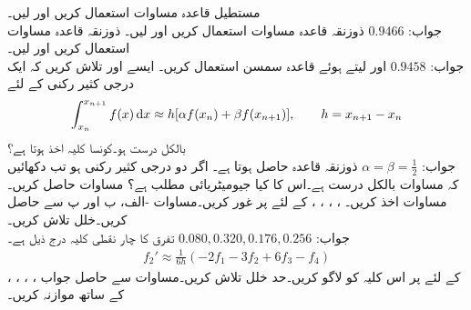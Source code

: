 \quad
مستطیل قاعدہ مساوات  استعمال کریں اور  لیں۔\\
جواب:\quad
$\num{0.9466}$
\quad
ذوزنقہ قاعدہ مساوات  استعمال کریں اور  لیں۔
\quad
ذوزنقہ قاعدہ مساوات  استعمال کریں اور  لیں۔\\
جواب:\quad
$\num{0.9458}$
\quad
{} اور  لیتے ہوئے قاعدہ سمسن  استعمال کریں۔
\quad
ایسے  اور  تلاش کریں کہ ایک درجی کثیر رکنی کے لئے
\begin{align*}
\int_{x_n}^{x_{n+1}}f(x)\dif x\approx h[\alpha f(x_n)+\beta f(x_{n+1})],\quad \quad h=x_{n+1}-x_n
\end{align*}
بالکل درست ہو۔کونسا کلیہ اخذ ہوتا ہے؟\\
جواب:\quad
$\alpha=\beta=\tfrac{1}{2}$
ذوزنقہ قاعدہ حاصل ہوتا ہے۔
\quad
اگر  دو درجی کثیر رکنی ہو تب دکھائیں کہ مساوات  بالکل درست ہے۔اس کا کیا جیومیٹریائی مطلب ہے؟  
\quad
مساوات  حاصل کریں۔
\quad
مساوات  اخذ کریں۔
\quad
{}، ، ، ،  کے لئے  پر غور کریں۔مساوات -الف، ب اور پ سے  حاصل کریں۔خلل تلاش کریں۔\\
جواب:\quad
$0.080,0.320,0.176,0.256$
\quad
تفرق کا چار نقطی کلیہ درج ذیل ہے۔
\begin{align*}
f_2'\approx \frac{1}{6h}(-2f_1-3f_2+6f_3-f_4)
\end{align*}
، ، ، ،  کے لئے  پر اس کلیہ کو لاگو کریں۔حد خلل تلاش کریں۔مساوات  سے حاصل جواب کے ساتھ موازنہ کریں۔
\quad
